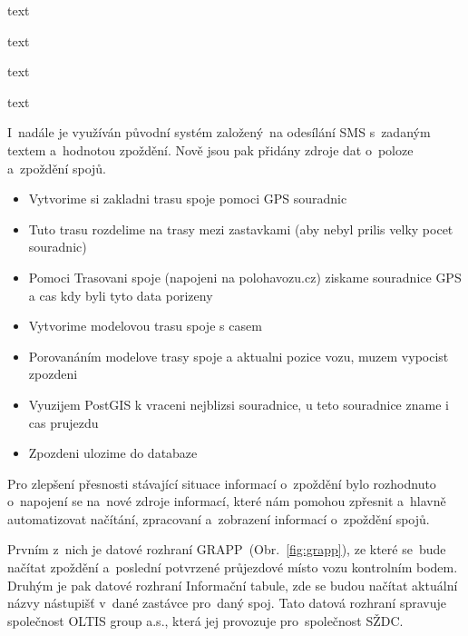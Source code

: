 
text

text

text

text

I~nadále je využíván původní systém založený~na odesílání SMS s~zadaným textem a~hodnotou zpoždění. Nově jsou pak přidány zdroje dat o~poloze a~zpoždění spojů.

\begin{itemize}
	\item Vytvorime si zakladni trasu spoje pomoci GPS souradnic
	\item Tuto trasu rozdelime na trasy mezi zastavkami (aby nebyl prilis velky pocet souradnic)
	\item Pomoci Trasovani spoje (napojeni na polohavozu.cz) ziskame souradnice GPS a cas kdy byli tyto data porizeny
	\item Vytvorime modelovou trasu spoje s casem
	\item Porovanáním modelove trasy spoje a aktualni pozice vozu, muzem vypocist zpozdeni
	\item Vyuzijem PostGIS k vraceni nejblizsi souradnice, u teto souradnice zname i cas prujezdu
	\item Zpozdeni ulozime do databaze
\end{itemize}


Pro zlepšení přesnosti stávající situace informací o~zpoždění bylo rozhodnuto o~napojení se na~nové zdroje informací, které nám pomohou zpřesnit a~hlavně automatizovat načítání, zpracovaní a~zobrazení informací o~zpoždění spojů.

Prvním z~nich je datové rozhraní GRAPP~(Obr.~\ref{fig:grapp}), ze které se~bude načítat zpoždění a~poslední potvrzené průjezdové místo vozu kontrolním bodem. Druhým je pak datové rozhraní Informační tabule, zde se budou načítat aktuální názvy nástupišť v~dané zastávce pro~daný spoj. Tato datová rozhraní spravuje společnost OLTIS group a.s., která jej provozuje pro~společnost SŽDC.

